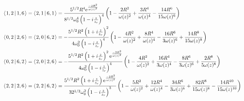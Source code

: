 \documentclass[11pt]{amsart}
\makeatletter
\newcommand{\e}{{\rm e}}				%
\newcommand{\msp}[1]{\mspace{#1mu}}		%
\newcommand{\0}{\varnothing}		%
\newcommand{\brac}[2]{\left\langle\msp{2} #1\left\lvert \msp{3.5} #2 \right.\right\rangle}	%
\newcommand{\1}{!}
\newcommand{\2}{@}
\newcommand{\3}{\#}
\newcommand{\4}{\$}
\newcommand{\5}{\%}
\newcommand{\6}{$^\wedge$}
\newcommand{\7}{\&}
\newcommand{\8}{*}
\newcommand{\9}{(}
\makeatother
\begin{document}
\begin{align*}
\\
&
\brac{1,2}{1,6} = \brac{2,1}{6,1} =\frac{5^{1/2}R^4\e^{\frac{-2R^2}{\omega(z)^2}}}{8^{1/2}\omega_0^4\left(1-i\frac{z}{z_r}\right)^4}\left(1-\frac{2R^2}{\omega(z)^2}+\frac{3R^4}{\omega(z)^4}-\frac{14R^6}{15\omega(z)^6}\right)
\\
&
\brac{0,2}{2,6}=\brac{2,0}{6,2} = -\frac{5^{1/2}R^2\left(1+i\frac{z}{z_r}\right)^2}{4\omega_0^2\left(1-i\frac{z}{z_r}\right)^4}\left(1-\frac{4R^2}{\omega(z)^2}+\frac{8R^4}{\omega(z)^4}-\frac{16R^6}{3\omega(z)^6}+\frac{14R^8}{15\omega(z)^8}\right)
\\
&
\brac{0,2}{6,2} = \brac{2,0}{2,6} = -\frac{5^{1/2}R^2\left(1+i\frac{z}{z_r}\right)^2\e^{\frac{-2R^2}{\omega(z)^2}}}{4\omega_0^2\left(1-i\frac{z}{z_r}\right)^4}\left(1-\frac{4R^2}{\omega(z)^2}+\frac{16R^4}{3\omega(z)^4}-\frac{8R^6}{3\omega(z)^6}+\frac{2R^8}{5\omega(z)^8}\right)
\\
&
\brac{2,2}{2,6} = \brac{2,2}{6,2} = \frac{5^{1/2}R^2\left(1+i\frac{z}{z_r}\right)\e^{\frac{-2R^2}{\omega(z)^2}}}{32^{1/2}\omega_0^2\left(1-i\frac{z}{z_r}\right)^3}\left(1-\frac{5R^2}{\omega(z)^2}+\frac{12R^4}{\omega(z)^4}-\frac{34R^6}{3\omega(z)^6}+\frac{82R^8}{15\omega(z)^8}-\frac{14R^{10}}{15\omega(z)^{10}}\right)
\end{align*}
\end{document}
